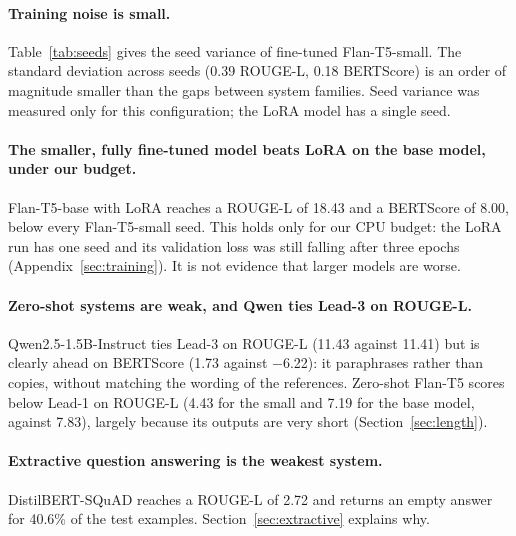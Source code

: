 \paragraph{Training noise is small.} Table~\ref{tab:seeds} gives the seed variance of fine-tuned Flan-T5-small. The standard deviation across seeds (0.39 ROUGE-L, 0.18 BERTScore) is an order of magnitude smaller than the gaps between system families. Seed variance was measured only for this configuration; the LoRA model has a single seed.

\begin{table}[htbp]
    \centering
    \small
    \caption[Seed variance]{Seed variance of fine-tuned Flan-T5-small (mean $\pm$ standard deviation over seeds 42, 43 and 44).}
    \label{tab:seeds}
\end{table}

\paragraph{The smaller, fully fine-tuned model beats LoRA on the base model, under our budget.} Flan-T5-base with LoRA reaches a ROUGE-L of 18.43 and a BERTScore of 8.00, below every Flan-T5-small seed. This holds only for our CPU budget: the LoRA run has one seed and its validation loss was still falling after three epochs (Appendix~\ref{sec:training}). It is not evidence that larger models are worse.

\paragraph{Zero-shot systems are weak, and Qwen ties Lead-3 on ROUGE-L.} Qwen2.5-1.5B-Instruct ties Lead-3 on ROUGE-L (11.43 against 11.41) but is clearly ahead on BERTScore (1.73 against $-$6.22): it paraphrases rather than copies, without matching the wording of the references. Zero-shot Flan-T5 scores below Lead-1 on ROUGE-L (4.43 for the small and 7.19 for the base model, against 7.83), largely because its outputs are very short (Section~\ref{sec:length}).

\paragraph{Extractive question answering is the weakest system.} DistilBERT-SQuAD reaches a ROUGE-L of 2.72 and returns an empty answer for 40.6\% of the test examples. Section~\ref{sec:extractive} explains why.

